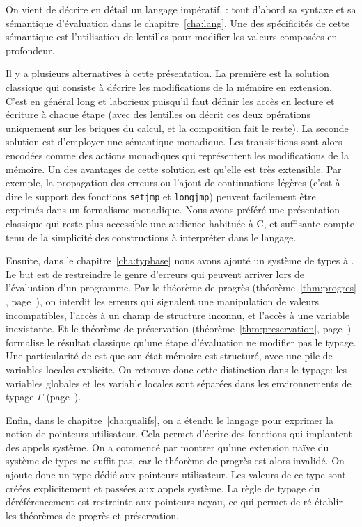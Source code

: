 On vient de décrire en détail un langage impératif, \langname: tout d'abord sa
syntaxe et sa sémantique d'évaluation dans le chapitre~\ref{cha:lang}. Une des
spécificités de cette sémantique est l'utilisation de lentilles pour modifier
les valeurs composées en profondeur.

\label{page:ccl-II-monad}
Il y a plusieurs alternatives à cette présentation. La première est la solution
classique qui consiste à décrire les modifications de la mémoire en extension.
C'est en général long et laborieux puisqu'il faut définir les accès en lecture
et écriture à chaque étape (avec des lentilles on décrit ces deux opérations
uniquement sur les briques du calcul, et la composition fait le reste). La
seconde solution est d'employer une sémantique monadique. Les transisitions sont
alors encodées comme des actions monadiques qui représentent les modifications
de la mémoire. Un des avantages de cette solution est qu'elle est très
extensible. Par exemple, la propagation des erreurs ou l'ajout de continuations
légères (c'est-à-dire le support des fonctions \texttt{setjmp} et
\texttt{longjmp}) peuvent facilement être exprimés dans un formalisme monadique.
Nous avons préféré une présentation classique qui reste plus accessible une
audience habituée à C, et suffisante compte tenu de la simplicité des
constructions à interpréter dans le langage.

Ensuite, dans le chapitre~\ref{cha:typbase} nous avons ajouté un système de
types à \langname. Le but est de restreindre le genre d'erreurs qui peuvent
arriver lors de l'évaluation d'un programme. Par le théorème de progrès
(théorème~\ref{thm:progres} , page~\pageref{thm:progres}), on interdit les
erreurs qui signalent une manipulation de valeurs incompatibles, l'accès à un
champ de structure inconnu, et l'accès à une variable inexistante. Et le
théorème de préservation (théorème~\ref{thm:preservation},
page~\pageref{thm:preservation}) formalise le résultat classique qu'une étape
d'évaluation ne modifier pas le typage.
Une particularité de \langname est que son état mémoire est structuré, avec une
pile de variables locales explicite. On retrouve donc cette distinction dans le
typage: les variables globales et les variable locales sont séparées dans les
environnements de typage $Γ$ (page~\pageref{page:gamma-split}).

Enfin, dans le chapitre~\ref{cha:qualifs}, on a étendu le langage pour exprimer
la notion de pointeurs utilisateur. Cela permet d'écrire des fonctions qui
implantent des appels système. On a commencé par montrer qu'une extension naïve
du système de types ne suffit pas, car le théorème de progrès est alors
invalidé. On ajoute donc un type dédié aux pointeurs utilisateur. Les valeurs de
ce type sont créées explicitement et passées aux appels système. La règle de
typage du déréférencement est restreinte aux pointeurs noyau, ce qui permet de
ré-établir les théorèmes de progrès et préservation.

